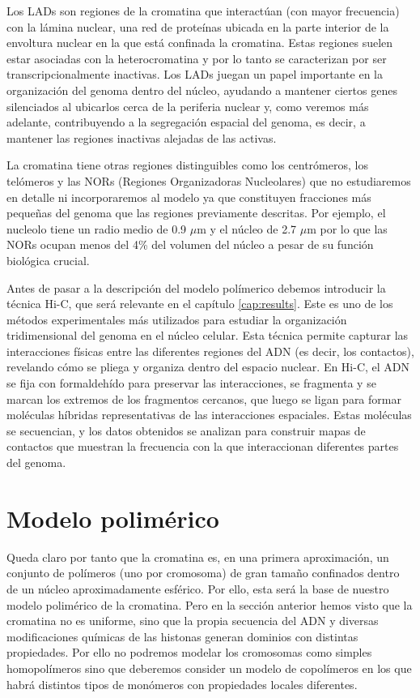 Los LADs son regiones de la cromatina que interactúan (con mayor frecuencia) con la lámina nuclear, una red de proteínas ubicada en la parte interior de la envoltura nuclear en la que está confinada la cromatina. Estas regiones suelen estar asociadas con la heterocromatina y por lo tanto se caracterizan por ser transcripcionalmente inactivas. Los LADs juegan un papel importante en la organización del genoma dentro del núcleo, ayudando a mantener ciertos genes silenciados al ubicarlos cerca de la periferia nuclear y, como veremos más adelante, contribuyendo a la segregación espacial del genoma, es decir, a mantener las regiones inactivas alejadas de las activas.

La cromatina tiene otras regiones distinguibles como los centrómeros, los telómeros y las NORs (Regiones Organizadoras Nucleolares) que no estudiaremos en detalle ni incorporaremos al modelo ya que constituyen fracciones más pequeñas del genoma que las regiones previamente descritas. Por ejemplo, el nucleolo tiene un radio medio de 0.9 $\mu$m y el núcleo de 2.7 $\mu$m \cite{Milo2009} por lo que las NORs ocupan menos del 4\% del volumen del núcleo a pesar de su función biológica crucial.

Antes de pasar a la descripción del modelo polímerico debemos introducir la técnica Hi-C, que será relevante en el capítulo \ref{cap:results}. Este es uno de los métodos experimentales más utilizados para estudiar la organización tridimensional del genoma en el núcleo celular. Esta técnica permite capturar las interacciones físicas entre las diferentes regiones del ADN (es decir, los contactos), revelando cómo se pliega y organiza dentro del espacio nuclear. En Hi-C, el ADN se fija con formaldehído para preservar las interacciones, se fragmenta y se marcan los extremos de los fragmentos cercanos, que luego se ligan para formar moléculas híbridas representativas de las interacciones espaciales. Estas moléculas se secuencian, y los datos obtenidos se analizan para construir mapas de contactos que muestran la frecuencia con la que interaccionan diferentes partes del genoma.

\section{Modelo polimérico}

Queda claro por tanto que la cromatina es, en una primera aproximación, un conjunto de polímeros (uno por cromosoma) de gran tamaño confinados dentro de un núcleo aproximadamente esférico. Por ello, esta será la base de nuestro modelo polimérico de la cromatina. Pero en la sección anterior hemos visto que la cromatina no es uniforme, sino que la propia secuencia del ADN y diversas modificaciones químicas de las histonas generan dominios con distintas propiedades. Por ello no podremos modelar los cromosomas como simples homopolímeros sino que deberemos consider un modelo de copolímeros en los que habrá distintos tipos de monómeros con propiedades locales diferentes.

